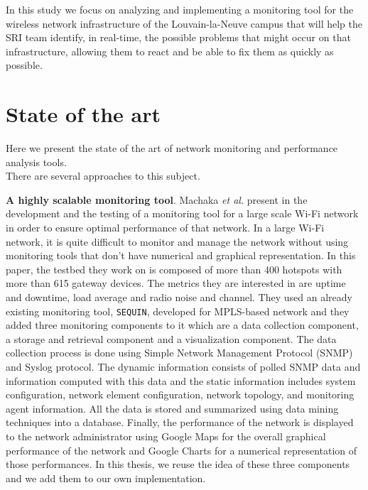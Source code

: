 In this study we focus on analyzing and implementing a monitoring tool for the wireless network infrastructure of the Louvain-la-Neuve campus that will help the SRI team identify, in real-time, the possible problems that might occur on that infrastructure, allowing them to react and be able to fix them as quickly as possible.


\section{State of the art}
Here we present the state of the art of network monitoring and performance analysis tools.\\
There are several approaches to this subject.

\textbf{A highly scalable monitoring tool}. Machaka \textit{et al.} present in \cite{article1} the development and the testing of a monitoring tool for a large scale Wi-Fi network in order to ensure optimal performance of that network. In a large Wi-Fi network, it is quite difficult to monitor and manage the network without using monitoring tools that don't have numerical and graphical representation. In this paper, the testbed they work on is composed of more than 400 hotspots with more than 615 gateway devices. The metrics they are interested in are uptime and downtime, load average and radio noise and channel. 
They used an already existing monitoring tool, \texttt{SEQUIN}, developed for MPLS-based network and they added three monitoring components to it which are a data collection component, a storage and retrieval component and a visualization component. The data collection process is done using Simple Network Management Protocol (SNMP) and Syslog protocol. The dynamic information consists of polled SNMP data and information computed with this data and the static information includes system configuration, network element configuration, network topology, and monitoring agent information. All the data is stored and summarized using data mining techniques into a database. Finally, the performance of the network is displayed to the network administrator using Google Maps for the overall graphical performance of the network and Google Charts for a numerical representation of those performances.  In this thesis, we reuse the idea of these three components and we add them to our own implementation.

